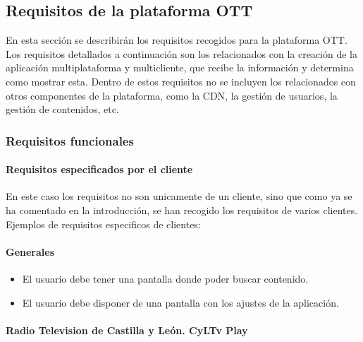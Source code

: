 \subsection{Requisitos de la plataforma OTT}
\label{subsec:analisis_requisitos_plataforma_ott}

En esta sección se describirán los requisitos recogidos para la plataforma OTT. Los requisitos detallados a 
continuación son los relacionados con la creación de la aplicación multiplataforma y multicliente, que recibe
la información y determina como mostrar esta. Dentro de estos requisitos no se incluyen los relacionados 
con otros componentes de la plataforma, como la CDN, la gestión de usuarios, la gestión de contenidos, etc.

\subsubsection{Requisitos funcionales}
\label{subsubsec:analisis_requisitos_funcionales}

\paragraph{Requisitos especificados por el cliente}
\label{par:analisis_requisitos_funcionales_cliente}

En este caso los requisitos no son unicamente de un cliente, sino que como ya se ha comentado
en la introducción, se han recogido los requisitos de varios clientes. Ejemplos de requisitos
especificos de clientes:

\paragraph{Generales}
\label{par:analisis_requisitos_funcionales_generales}

\begin{itemize}
    \item El usuario debe tener una pantalla donde poder buscar contenido.
    \item El usuario debe disponer de una pantalla con los ajustes de la aplicación.
\end{itemize}

\paragraph{Radio Television de Castilla y León. CyLTv Play}
\label{par:analisis_requisitos_funcionales_cyltvplay}

